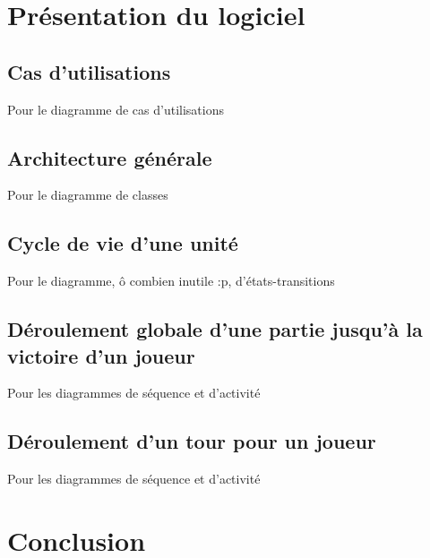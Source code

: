 \documentclass[12pt]{article}
\begin{document}
\section{Présentation du logiciel}

\subsection{Cas d'utilisations}
Pour le diagramme de cas d'utilisations
\subsection{Architecture générale}
Pour le diagramme de classes
\subsection{Cycle de vie d'une unité}
Pour le diagramme, ô combien inutile :p, d'états-transitions
\subsection{Déroulement globale d'une partie jusqu'à la victoire d'un joueur}
Pour les diagrammes de séquence et d'activité
\subsection{Déroulement d'un tour pour un joueur}
Pour les diagrammes de séquence et d'activité
\newpage

\section{Conclusion}

\newpage



\end{document}
